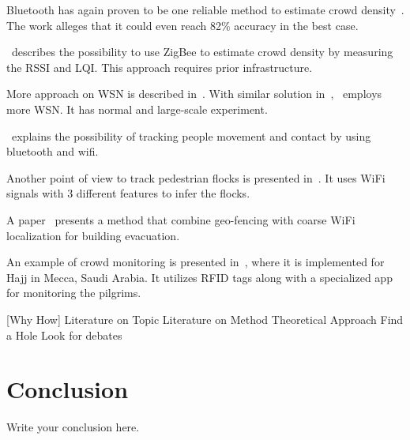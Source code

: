 \documentclass{article}
\begin{document}
Bluetooth has again proven to be one reliable method to estimate crowd density~\cite{thesis041}. The work alleges that it could even reach 82\% accuracy in the best case.

\cite{thesis042}~describes the possibility to use ZigBee to estimate crowd density by measuring the RSSI and LQI. This approach requires prior infrastructure.

More approach on WSN is described in~\cite{thesis043}. With similar solution in~\cite{thesis042},~\cite{thesis043} employs more WSN. It has normal and large-scale experiment.

\cite{thesis022}~explains the possibility of tracking people movement and contact by using bluetooth and wifi.

Another point of view to track pedestrian flocks is presented in~\cite{thesis033}. It uses WiFi signals with 3 different features to infer the flocks.

A paper~\cite{thesis045} presents a method that combine geo-fencing with coarse WiFi localization for building evacuation.

An example of crowd monitoring is presented in~\cite{thesis050}, where it is implemented for Hajj in Mecca, Saudi Arabia. It utilizes RFID tags along with a specialized app for monitoring the pilgrims.

[Why How]
Literature on Topic
Literature on Method
Theoretical Approach
Find a Hole
Look for debates

\section{Conclusion}
Write your conclusion here.

{}

\end{document}
